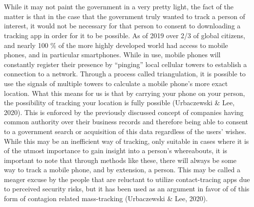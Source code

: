 \documentclass[11pt]{article}
\begin{document}
\\ \\
While it may not paint the government in a very pretty light, the fact of the matter is that in the case that the government truly wanted to track a person of interest, it would not be necessary for that person to consent to downloading a tracking app in order for it to be possible.
As of 2019 over 2/3 of global citizens, and nearly 100 $\%$ of the more highly developed world had access to mobile phones, and in particular smartphones. While in use, mobile phones will constantly register their presence by “pinging” local cellular towers to establish a connection to a network. Through a process called triangulation, it is possible to use the signals of multiple towers to calculate a mobile phone’s more exact location. What this means for us is that by carrying your phone on your person, the possibility of tracking your location is fully possible (Urbaczewski & Lee, 2020). This is enforced by the previously discussed concept of companies having common authority over their business records and therefore being able to consent to a government search or acquisition of this data regardless of the users’ wishes. 
While this may be an inefficient way of tracking, only suitable in cases where it is of the utmost importance to gain insight into a person’s whereabouts, it is important to note that through methods like these, there will always be some way to track a mobile phone, and by extension, a person.
This may be called a meager excuse by the people that are reluctant to utilize contact-tracing apps due to perceived security risks, but it has been used as an argument in favor of of this form of contagion related mass-tracking (Urbaczewski & Lee, 2020).
\\
\end{document}

